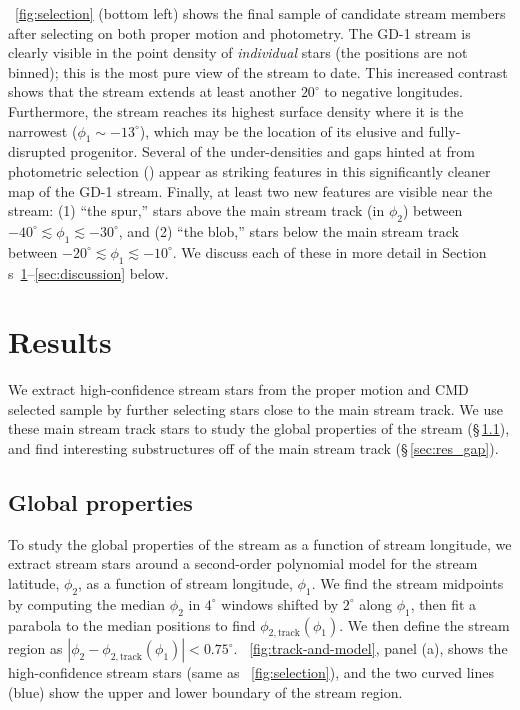 \documentclass[modern]{aastex62}
\newcommand{\sectionname}{Section}
\begin{document}
\figurename~\ref{fig:selection} (bottom left) shows the final sample of
candidate stream members after selecting on both proper motion and photometry.
The GD-1 stream is clearly visible in the point density of \emph{individual}
stars (the positions are not binned); this is the most pure view of the stream
to date.
This increased contrast shows that the stream extends at least another
$20^\circ$ to negative longitudes.
Furthermore, the stream reaches its highest surface density where it is the
narrowest ($\phi_1\sim-13^\circ$), which may be the location of its elusive and
fully-disrupted progenitor.
Several of the under-densities and gaps hinted at from photometric selection
(\citealt{Koposov:2010, Carlberg:2013}) appear as striking features in this
significantly cleaner map of the GD-1 stream.
Finally, at least two new features are visible near the stream: (1) ``the
spur,'' stars above the main stream track (in $\phi_2$) between $-40^\circ
\lesssim \phi_1 \lesssim -30^\circ$, and (2) ``the blob,'' stars below the main
stream track between $-20^\circ \lesssim \phi_1 \lesssim -10^\circ$.
We discuss each of these in more detail in \sectionname
s~\ref{sec:results}--\ref{sec:discussion} below.


\section{Results}
\label{sec:results}

We extract high-confidence stream stars from the proper motion and CMD selected
sample by further selecting stars close to the main stream track.
We use these main stream track stars to study the global properties of the
stream (\S\,\ref{sec:res_global}), and find interesting substructures off of the main stream track (\S\,\ref{sec:res_gap}).

\subsection{Global properties}
\label{sec:res_global}

To study the global properties of the stream as a function of stream longitude,
we extract stream stars around a second-order polynomial model for the stream
latitude, $\phi_2$, as a function of stream longitude, $\phi_1$.
We find the stream midpoints by computing the median $\phi_2$ in $4^\circ$
windows shifted by $2^\circ$ along $\phi_1$, then fit a parabola to the median
positions to find $\phi_{2, \textrm{track}}(\phi_1)$.
We then define the stream region as $\left| \phi_2 - \phi_{2,
\textrm{track}}(\phi_1) \right| < 0.75^\circ$.
\figurename~\ref{fig:track-and-model}, panel (a), shows the high-confidence
stream stars (same as \figurename~\ref{fig:selection}), and the two curved lines
(blue) show the upper and lower boundary of the stream region.
\end{document}
